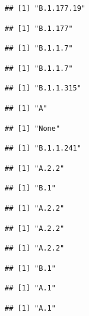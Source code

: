 \documentclass[]{article}
\begin{document}
\begin{verbatim}
## [1] "B.1.177.19"
\end{verbatim}

\begin{verbatim}
## [1] "B.1.177"
\end{verbatim}

\begin{verbatim}
## [1] "B.1.1.7"
\end{verbatim}

\begin{verbatim}
## [1] "B.1.1.7"
\end{verbatim}

\begin{verbatim}
## [1] "B.1.1.315"
\end{verbatim}

\begin{verbatim}
## [1] "A"
\end{verbatim}

\begin{verbatim}
## [1] "None"
\end{verbatim}

\begin{verbatim}
## [1] "B.1.1.241"
\end{verbatim}

\begin{verbatim}
## [1] "A.2.2"
\end{verbatim}

\begin{verbatim}
## [1] "B.1"
\end{verbatim}

\begin{verbatim}
## [1] "A.2.2"
\end{verbatim}

\begin{verbatim}
## [1] "A.2.2"
\end{verbatim}

\begin{verbatim}
## [1] "A.2.2"
\end{verbatim}

\begin{verbatim}
## [1] "B.1"
\end{verbatim}

\begin{verbatim}
## [1] "A.1"
\end{verbatim}

\begin{verbatim}
## [1] "A.1"
\end{verbatim}
\end{document}
